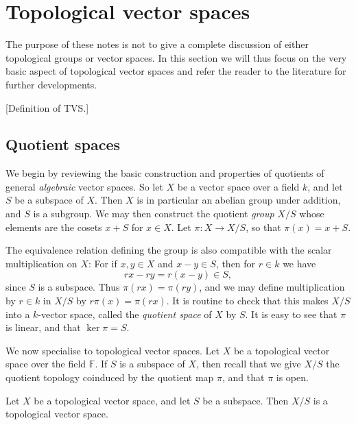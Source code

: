 \documentclass[article, a4paper, 11pt, oneside]{memoir}
\numberwithin{equation}{chapter}
\begin{document}
\chapter{Topological vector spaces}

The purpose of these notes is not to give a complete discussion of either topological groups or vector spaces. In this section we will thus focus on the very basic aspect of topological vector spaces and refer the reader to the literature for further developments.

[Definition of TVS.]

\section{Quotient spaces}

We begin by reviewing the basic construction and properties of quotients of general \emph{algebraic} vector spaces. So let $X$ be a vector space over a field $k$, and let $S$ be a subspace of $X$. Then $X$ is in particular an abelian group under addition, and $S$ is a subgroup. We may then construct the quotient \emph{group} $X/S$ whose elements are the cosets $x + S$ for $x \in X$. Let $\pi \colon X \to X/S$, so that $\pi(x) = x + S$.

The equivalence relation defining the group is also compatible with the scalar multiplication on $X$: For if $x,y \in X$ and $x - y \in S$, then for $r \in k$ we have
%
\begin{equation*}
    rx - ry
        = r(x - y) \in S,
\end{equation*}
%
since $S$ is a subspace. Thus $\pi(rx) = \pi(ry)$, and we may define multiplication by $r \in k$ in $X/S$ by $r \pi(x) = \pi(rx)$. It is routine to check that this makes $X/S$ into a $k$-vector space, called the \emph{quotient space} of $X$ by $S$. It is easy to see that $\pi$ is linear, and that $\ker \pi = S$.

\newcommand{\setF}{\mathbb{F}}

We now specialise to topological vector spaces. Let $X$ be a topological vector space over the field $\setF$. If $S$ is a subspace of $X$, then recall that we give $X/S$ the quotient topology coinduced by the quotient map $\pi$, and that $\pi$ is open.


\begin{theorem}
    Let $X$ be a topological vector space, and let $S$ be a subspace. Then $X/S$ is a topological vector space.
\end{theorem}
\end{document}
